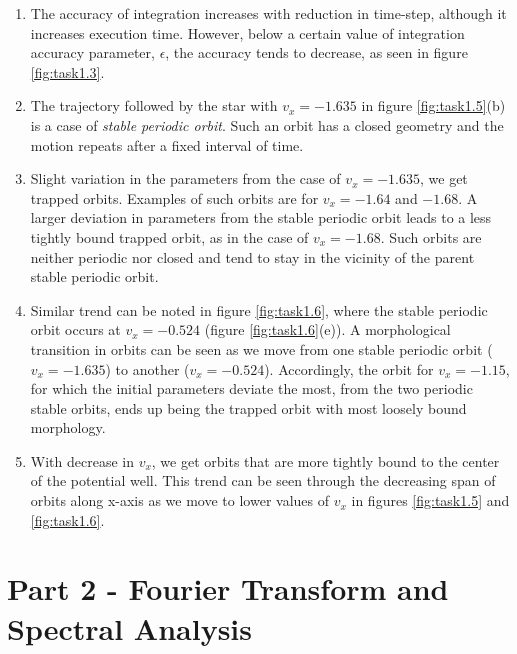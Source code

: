 \documentclass[a4paper]{article}
\begin{document}
		\begin{enumerate}
			
			\item The accuracy of integration increases with reduction in time-step, although it increases execution time. However, below a certain value of integration accuracy parameter, \(\epsilon\), the accuracy tends to decrease, as seen in figure \ref{fig:task1.3}.
			
			\item The trajectory followed by the star with \(v_x = -1.635\) in figure \ref{fig:task1.5}(b) is a case of \emph{stable periodic orbit}. Such an orbit has a closed geometry and the motion repeats after a fixed interval of time.
			
			\item Slight variation in the parameters from the case of \(v_x = -1.635\), we get trapped orbits. Examples of such orbits are  for \(v_x = -1.64\) and \(-1.68\). A larger deviation in parameters from the stable periodic orbit leads to a less tightly bound trapped orbit, as in the case of \(v_x = -1.68\). Such orbits are neither periodic nor closed and tend to stay in the vicinity of the parent stable periodic orbit.
			
			\item Similar trend can be noted in figure \ref{fig:task1.6}, where the stable periodic orbit occurs at \(v_x = -0.524\) (figure \ref{fig:task1.6}(e)). A morphological transition in orbits can be seen as we move from one stable periodic orbit (\(v_x = -1.635\)) to another (\(v_x = -0.524\)). Accordingly, the orbit for \(v_x = -1.15\), for which the initial parameters deviate the most, from the two periodic stable orbits, ends up being the trapped orbit with most loosely bound morphology.
			
			\item With decrease in \(v_x\), we get orbits that are more tightly bound to the center of the potential well. This trend can be seen through the decreasing span of orbits along x-axis as we move to lower values of \(v_x\) in figures \ref{fig:task1.5} and \ref{fig:task1.6}. 
			
		\end{enumerate}
		
	
	\clearpage
	\section{Part 2 - Fourier Transform and Spectral Analysis} \label{task2}
	
\end{document}
